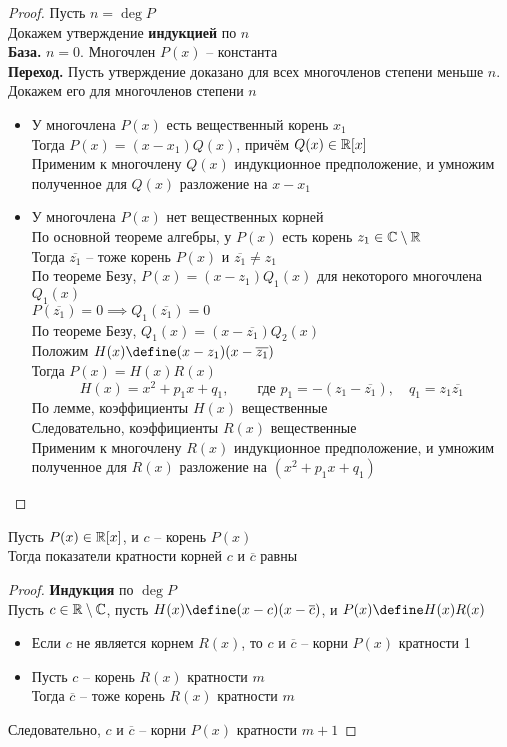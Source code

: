 \begin{proof}
	Пусть $n = \deg P$ \\
	Докажем утверждение \textbf{индукцией} по $n$ \\
	\textbf{База.} $n = 0$. Многочлен $P(x)$ -- константа \\
	\textbf{Переход.} Пусть утверждение доказано для всех многочленов степени меньше $n$. Докажем его для многочленов степени $n$
	\begin{itemize}
		\item У многочлена $P(x)$ есть вещественный корень $x_1$ \\
		Тогда $P(x) = (x - x_1)Q(x)$, причём $Q(x) \in \mathbb{R}[x]$ \\
		Применим к многочлену $Q(x)$ индукционное предположение, и умножим полученное для $Q(x)$ разложение на $x - x_1$
		\item У многочлена $P(x)$ нет вещественных корней \\
		По основной теореме алгебры, у $P(x)$ есть корень $z_1 \in \mathbb{C} \setminus \mathbb{R}$ \\
		Тогда $\overline{z_1}$ -- тоже корень $P(x)$ и $\overline{z_1} \ne z_1 $ \\
		По теореме Безу, $P(x) = (x - z_1)Q_1(x)$ для некоторого многочлена $Q_1(x)$ \\
		$ P(\overline{z_1}) = 0 \implies Q_1(\overline{z_1}) = 0 $ \\
		По теореме Безу, $Q_1(x) = (x - \overline{z_1})Q_2(x) $ \\
		Положим $H(x) \define (x - z_1)(x - \overline{z_1}) $ \\
		Тогда $P(x) = H(x)R(x)$
		$$ H(x) = x^2 + p_1x + q_1, \qquad \text{где } p_1 = -(z_1 - \overline{z_1}), \quad q_1 = z_1\overline{z_1} $$
		По лемме, коэффициенты $H(x)$ вещественные \\
		Следовательно, коэффициенты $R(x)$ вещественные \\
		Применим к многочлену $R(x)$ индукционное предположение, и умножим полученное для $R(x)$ разложение на $(x^2 + p_1x + q_1)$
	\end{itemize}
\end{proof}

\begin{implication}
	Пусть $P(x) \in \mathbb{R}[x]$, и $c$ -- корень $P(x)$ \\
	Тогда показатели кратности корней $c$ и $\overline{c}$ равны
\end{implication}

\begin{proof}
	\textbf{Индукция} по $\deg P$ \\
	Пусть $c \in \mathbb{R} \setminus \mathbb{C}$, пусть $H(x) \define (x - c)(x - \overline{c})$, и $P(x) \define H(x)R(x)$
	\begin{itemize}
		\item Если $c$ не является корнем $R(x)$, то $c$ и $\overline{c}$ -- корни $P(x)$ кратности 1
		\item Пусть $c$ -- корень $R(x)$ кратности $m$ \\
		Тогда $\overline{c}$ -- тоже корень $R(x)$ кратности $m$
	\end{itemize}
	Следовательно, $c$ и $\overline{c}$ -- корни $P(x)$ кратности $m + 1$
\end{proof}

